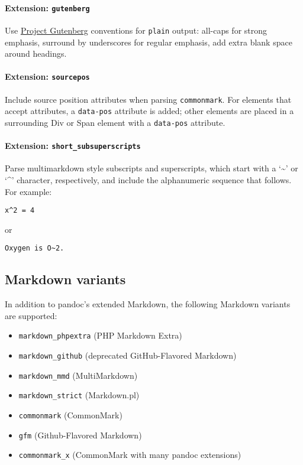 \documentclass[
]{article}
\providecommand{\tightlist}{%
  \setlength{\itemsep}{0pt}\setlength{\parskip}{0pt}}
\begin{document}
\paragraph{\texorpdfstring{Extension:
\texttt{gutenberg}}{Extension: gutenberg}}\label{extension-gutenberg}

Use \href{https://www.gutenberg.org}{Project Gutenberg} conventions for
\texttt{plain} output: all-caps for strong emphasis, surround by
underscores for regular emphasis, add extra blank space around headings.

\paragraph{\texorpdfstring{Extension:
\texttt{sourcepos}}{Extension: sourcepos}}\label{extension-sourcepos}

Include source position attributes when parsing \texttt{commonmark}. For
elements that accept attributes, a \texttt{data-pos} attribute is added;
other elements are placed in a surrounding Div or Span element with a
\texttt{data-pos} attribute.

\paragraph{\texorpdfstring{Extension:
\texttt{short\_subsuperscripts}}{Extension: short\_subsuperscripts}}\label{extension-short_subsuperscripts}

Parse multimarkdown style subscripts and superscripts, which start with
a `\textasciitilde{}' or `\^{}' character, respectively, and include the
alphanumeric sequence that follows. For example:

\begin{verbatim}
x^2 = 4
\end{verbatim}

or

\begin{verbatim}
Oxygen is O~2.
\end{verbatim}

\subsection{Markdown variants}\label{markdown-variants}

In addition to pandoc's extended Markdown, the following Markdown
variants are supported:

\begin{itemize}
\tightlist
\item
  \texttt{markdown\_phpextra} (PHP Markdown Extra)
\item
  \texttt{markdown\_github} (deprecated GitHub-Flavored Markdown)
\item
  \texttt{markdown\_mmd} (MultiMarkdown)
\item
  \texttt{markdown\_strict} (Markdown.pl)
\item
  \texttt{commonmark} (CommonMark)
\item
  \texttt{gfm} (Github-Flavored Markdown)
\item
  \texttt{commonmark\_x} (CommonMark with many pandoc extensions)
\end{itemize}
\end{document}
